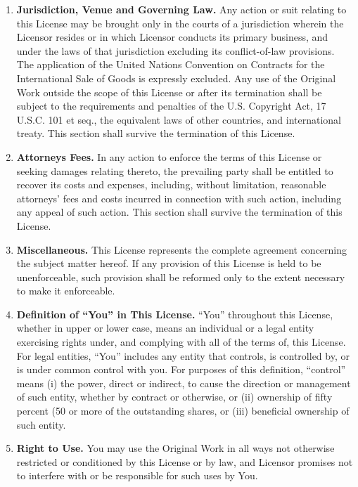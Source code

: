 \begin{it}
\begin{enumerate}
\item \textbf{Jurisdiction, Venue and Governing Law.}  Any action or suit relating to this 
      License may be brought only in the courts of a jurisdiction wherein the Licensor 
      resides or in which Licensor conducts its primary business, and under the laws
      of that jurisdiction excluding its conflict-of-law provisions. The application 
      of the United Nations Convention on Contracts for the International Sale of Goods 
      is expressly excluded. Any use of the Original Work outside the scope of this 
      License or after its termination shall be subject to the requirements and 
      penalties of the U.S. Copyright Act, 17 U.S.C. 101 et seq., the equivalent 
      laws of other countries, and international treaty. This section shall 
      survive the termination of this License. 

\item \textbf{Attorneys Fees.}  In any action to enforce the terms of this License or 
      seeking damages relating thereto, the prevailing party shall be entitled 
      to recover its costs and expenses, including, without limitation, reasonable 
      attorneys' fees and costs incurred in connection with such action, including
      any appeal of such action. This section shall survive the termination of 
      this License. 

\item \textbf{Miscellaneous.} This License represents the complete agreement 
      concerning the subject matter hereof. If any provision of this License 
      is held to be unenforceable, such provision shall be reformed only to 
      the extent necessary to make it enforceable. 

\item \textbf{Definition of ``You'' in This License.} ``You'' throughout this License, 
      whether in upper or lower case, means an individual or a legal entity 
      exercising rights under, and complying with all of the terms of, this 
      License. For legal entities, ``You'' includes any entity that controls, 
      is controlled by, or is under common control with you. For purposes of 
      this definition, ``control'' means (i) the power, direct or indirect, 
      to cause the direction or management of such entity, whether by 
      contract or otherwise, or (ii) ownership of fifty percent (50%
      or more of the outstanding shares, or (iii) beneficial ownership 
      of such entity. 

\item \textbf{Right to Use.}  You may use the Original Work in all ways not 
      otherwise restricted or conditioned by this License or by law, 
      and Licensor promises not to interfere with or be responsible 
      for such uses by You. 
\end{enumerate}
\end{it}


